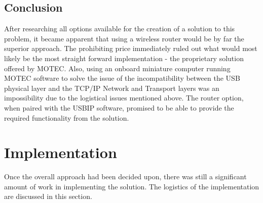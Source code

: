 \subsection{Conclusion}

After researching all options available for the creation of a solution to this problem, it became apparent that using a wireless router would be by far the superior approach. The prohibiting price immediately ruled out what would most likely be the most straight forward implementation - the proprietary solution offered by MOTEC. Also, using an onboard miniature computer running MOTEC software to solve the issue of the incompatibility between the USB physical layer and the TCP/IP Network and Transport layers was an impossibility due to the logistical issues mentioned above. The router option, when paired with the USBIP software, promised to be able to provide the required functionality from the solution.

\section{Implementation}
Once the overall approach had been decided upon, there was still a significant amount of work in implementing the solution. The logistics of the implementation are discussed in this section.


